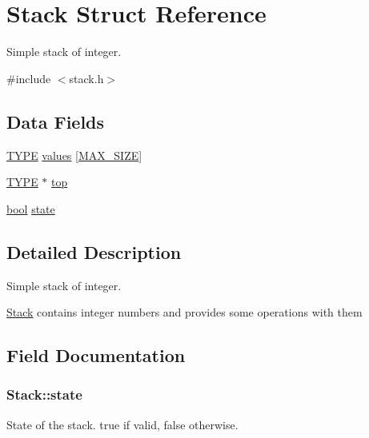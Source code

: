 \hypertarget{structStack}{}\section{Stack Struct Reference}
\label{structStack}


Simple stack of integer.  




{\ttfamily \#include $<$stack.\+h$>$}

\subsection*{Data Fields}
\begin{DoxyCompactItemize}
\item 
\hyperlink{stack_8h_a5a392548f2df67370cb15d2a5d75cd7b}{T\+Y\+P\+E} \hyperlink{structStack_ac2f6dee0e1fb8ef2549341f8653f8042}{values} \mbox{[}\hyperlink{stack_8h_a0592dba56693fad79136250c11e5a7fe}{M\+A\+X\+\_\+\+S\+I\+Z\+E}\mbox{]}
\item 
\hyperlink{stack_8h_a5a392548f2df67370cb15d2a5d75cd7b}{T\+Y\+P\+E} $\ast$ \hyperlink{structStack_a0d3673185c9d5e796ef049c9d3fcc890}{top}
\item 
\hyperlink{mylib_8h_abb452686968e48b67397da5f97445f5b}{bool} \hyperlink{structStack_ad0347db5e9967657527d8df4fa88644d}{state}
\end{DoxyCompactItemize}


\subsection{Detailed Description}
Simple stack of integer. 

\hyperlink{structStack}{Stack} contains integer numbers and provides some operations with them 

\subsection{Field Documentation}
\hypertarget{structStack_ad0347db5e9967657527d8df4fa88644d}{}
\subsubsection[{state}]{ Stack\+::state}\label{structStack_ad0347db5e9967657527d8df4fa88644d}
State of the stack. true if valid, false otherwise. \hypertarget{structStack_a0d3673185c9d5e796ef049c9d3fcc890}{}
